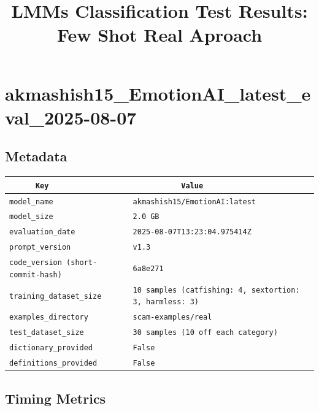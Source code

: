 \documentclass{article}
\begin{document}
\title{LMMs Classification Test Results: Few Shot Real Aproach}\n\maketitle\n\n\section{akmashish15\_EmotionAI\_latest\_eval\_2025-08-07}
\subsection{Metadata}

\begin{center}
\begin{tabular}{l | l} \hline
    \verb|      Key      | & \verb|           Value           | \\ \hline
    \hline
    \verb|model_name    | & \verb|akmashish15/EmotionAI:latest | \\ \hline
    \verb|model_size    | & \verb|2.0 GB                       | \\ \hline
    \verb|evaluation_date| & \verb|2025-08-07T13:23:04.975414Z  | \\ \hline
    \verb|prompt_version| & \verb|v1.3                         | \\ \hline
    \verb|code_version (short-commit-hash)| & \verb|6a8e271                      | \\ \hline
    \verb|training_dataset_size| & \verb|10 samples (catfishing: 4, sextortion: 3, harmless: 3)| \\ \hline
    \verb|examples_directory| & \verb|scam-examples/real           | \\ \hline
    \verb|test_dataset_size| & \verb|30 samples (10 off each category)| \\ \hline
    \verb|dictionary_provided| & \verb|False                        | \\ \hline
    \verb|definitions_provided| & \verb|False                        | \\ \hline
\end{tabular}
\end{center}

\subsection{Timing Metrics}
\end{document}

